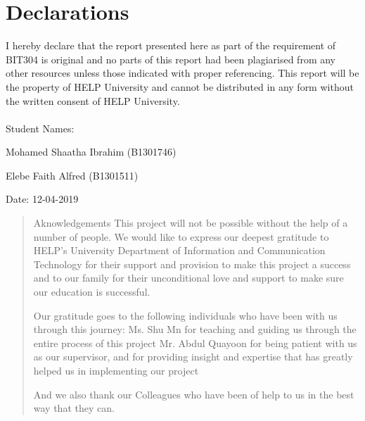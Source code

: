 \documentclass[12pt,a4paper,man]{report}
\begin{document}
\newpage
{}
\vspace*{\fill}
\section*{Declarations}
I hereby declare that the report presented here as part of the requirement of BIT304 is original and no parts of this report had been plagiarised from any other resources unless those indicated with proper referencing.  This report will be the property of HELP University and cannot be distributed in any form without the written consent of HELP University.
\\\\Student Names:
\begin{description}
 \item Mohamed Shaatha Ibrahim (B1301746)
 \item Elebe Faith Alfred (B1301511)
\end{description}
Date: 12-04-2019
\vspace*{\fill}

\renewcommand{\abstractname}{Acknowledgement}
\begin{abstract}
	Aknowledgements
	This project will not be possible without the help of a number of people. We would like to express our deepest gratitude to HELP's University Department of Information and Communication Technology for their support and provision to make this project a success and to our family for their unconditional love and support to make sure our education is successful.

Our gratitude goes to the following individuals who have been with us through this journey:
Ms. Shu Mn for teaching and guiding us through the entire process of this project
Mr. Abdul Quayoon for being patient with us as our supervisor, and for providing insight and expertise that has greatly helped us in implementing our project

And we also thank our Colleagues who have been of help to us in the best way that they can.
\end{abstract}



\newcommand\SentenceCase[1]{
  \caselower[e]{#1}
  \capitalize[q]{\thestring}
}
\newcommand*\parttitle{}
\let\origpart\part
\renewcommand*{\part}[2][]{%
   \ifx\\#1\\%
      \origpart{#2}%
      \renewcommand*\parttitle{#2}%
   \else
      \origpart[#1]{#2}%
      \renewcommand*\parttitle{#1}%
   \fi
}
\end{document}
